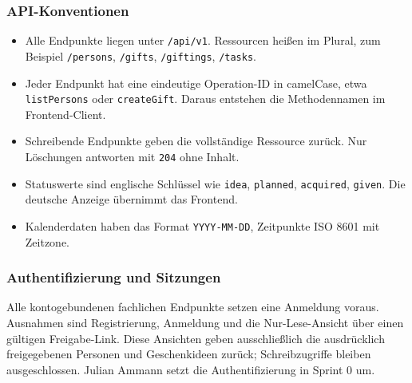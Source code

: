 \documentclass[11pt,a4paper]{article}
\begin{document}
\subsubsection{API-Konventionen}

\begin{itemize}
\item Alle Endpunkte liegen unter \texttt{/\allowbreak{}api/\allowbreak{}v1}. Ressourcen heißen im Plural, zum Beispiel \texttt{/\allowbreak{}persons}, \texttt{/\allowbreak{}gifts}, \texttt{/\allowbreak{}giftings}, \texttt{/\allowbreak{}tasks}.
\item Jeder Endpunkt hat eine eindeutige Operation-ID in camelCase, etwa \texttt{listPersons} oder \texttt{createGift}. Daraus entstehen die Methodennamen im Frontend-Client.
\item Schreibende Endpunkte geben die vollständige Ressource zurück. Nur Löschungen antworten mit \texttt{204} ohne Inhalt.
\item Statuswerte sind englische Schlüssel wie \texttt{idea}, \texttt{planned}, \texttt{acquired}, \texttt{given}. Die deutsche Anzeige übernimmt das Frontend.
\item Kalenderdaten haben das Format \texttt{YYYY-MM-DD}, Zeitpunkte ISO 8601 mit Zeitzone.
\end{itemize}


\subsubsection{Authentifizierung und Sitzungen}

Alle kontogebundenen fachlichen Endpunkte setzen eine Anmeldung voraus. Ausnahmen sind Registrierung, Anmeldung und die Nur-Lese-Ansicht über einen gültigen Freigabe-Link. Diese Ansichten geben ausschließlich die ausdrücklich freigegebenen Personen und Geschenkideen zurück; Schreibzugriffe bleiben ausgeschlossen. Julian Ammann setzt die Authentifizierung in Sprint 0 um.
\end{document}
